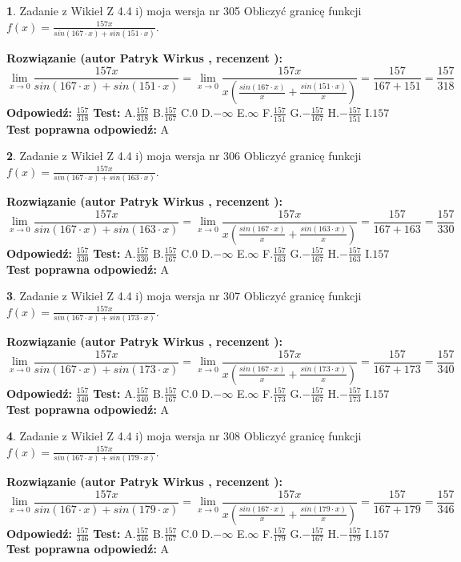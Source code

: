 \documentclass[12pt, a4paper]{article}
\theoremstyle{definition} %
\newtheorem{zad}{}
\newcommand{\zadStart}[1]{\begin{zad}#1\newline}
\newcommand{\zadStop}{\end{zad}}
\newcommand{\rozwStart}[2]{\noindent \textbf{Rozwiązanie (autor #1 , recenzent #2): }\newline}
\newcommand{\rozwStop}{\newline}
\newcommand{\odpStart}{\noindent \textbf{Odpowiedź:}\newline}
\newcommand{\odpStop}{\newline}
\newcommand{\testStart}{\noindent \textbf{Test:}\newline}
\newcommand{\testStop}{\newline}
\newcommand{\kluczStart}{\noindent \textbf{Test poprawna odpowiedź:}\newline}
\newcommand{\kluczStop}{\newline}
\begin{document}
\zadStart{Zadanie z Wikieł Z 4.4 i) moja wersja nr 305}
Obliczyć granicę funkcji $f(x)=\frac{157x}{sin(167\cdot x) +sin(151\cdot x)}$.
\zadStop
\rozwStart{Patryk Wirkus}{}
$$\lim\limits_{x\to 0}\frac{157x}{sin(167\cdot x) +sin(151\cdot x)}=\lim\limits_{x\to 0}\frac{157x}{x(\frac{sin(167\cdot x)}{x}+\frac{sin(151\cdot x)}{x})}=\frac{157}{167+151} = \frac{157}{318}$$
\rozwStop
\odpStart
$\frac{157}{318}$
\odpStop
\testStart
A.$\frac{157}{318}$
B.$\frac{157}{167}$
C.$0$
D.$-\infty$
E.$\infty$
F.$\frac{157}{151}$
G.$-\frac{157}{167}$
H.$-\frac{157}{151}$
I.$157$
\testStop
\kluczStart
A
\kluczStop



\zadStart{Zadanie z Wikieł Z 4.4 i) moja wersja nr 306}
Obliczyć granicę funkcji $f(x)=\frac{157x}{sin(167\cdot x) +sin(163\cdot x)}$.
\zadStop
\rozwStart{Patryk Wirkus}{}
$$\lim\limits_{x\to 0}\frac{157x}{sin(167\cdot x) +sin(163\cdot x)}=\lim\limits_{x\to 0}\frac{157x}{x(\frac{sin(167\cdot x)}{x}+\frac{sin(163\cdot x)}{x})}=\frac{157}{167+163} = \frac{157}{330}$$
\rozwStop
\odpStart
$\frac{157}{330}$
\odpStop
\testStart
A.$\frac{157}{330}$
B.$\frac{157}{167}$
C.$0$
D.$-\infty$
E.$\infty$
F.$\frac{157}{163}$
G.$-\frac{157}{167}$
H.$-\frac{157}{163}$
I.$157$
\testStop
\kluczStart
A
\kluczStop



\zadStart{Zadanie z Wikieł Z 4.4 i) moja wersja nr 307}
Obliczyć granicę funkcji $f(x)=\frac{157x}{sin(167\cdot x) +sin(173\cdot x)}$.
\zadStop
\rozwStart{Patryk Wirkus}{}
$$\lim\limits_{x\to 0}\frac{157x}{sin(167\cdot x) +sin(173\cdot x)}=\lim\limits_{x\to 0}\frac{157x}{x(\frac{sin(167\cdot x)}{x}+\frac{sin(173\cdot x)}{x})}=\frac{157}{167+173} = \frac{157}{340}$$
\rozwStop
\odpStart
$\frac{157}{340}$
\odpStop
\testStart
A.$\frac{157}{340}$
B.$\frac{157}{167}$
C.$0$
D.$-\infty$
E.$\infty$
F.$\frac{157}{173}$
G.$-\frac{157}{167}$
H.$-\frac{157}{173}$
I.$157$
\testStop
\kluczStart
A
\kluczStop



\zadStart{Zadanie z Wikieł Z 4.4 i) moja wersja nr 308}
Obliczyć granicę funkcji $f(x)=\frac{157x}{sin(167\cdot x) +sin(179\cdot x)}$.
\zadStop
\rozwStart{Patryk Wirkus}{}
$$\lim\limits_{x\to 0}\frac{157x}{sin(167\cdot x) +sin(179\cdot x)}=\lim\limits_{x\to 0}\frac{157x}{x(\frac{sin(167\cdot x)}{x}+\frac{sin(179\cdot x)}{x})}=\frac{157}{167+179} = \frac{157}{346}$$
\rozwStop
\odpStart
$\frac{157}{346}$
\odpStop
\testStart
A.$\frac{157}{346}$
B.$\frac{157}{167}$
C.$0$
D.$-\infty$
E.$\infty$
F.$\frac{157}{179}$
G.$-\frac{157}{167}$
H.$-\frac{157}{179}$
I.$157$
\testStop
\kluczStart
A
\kluczStop
\end{document}
